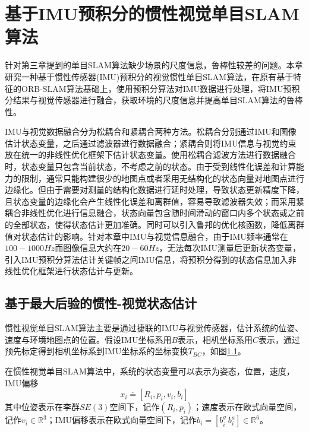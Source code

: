 
\chapter{基于IMU预积分的惯性视觉单目SLAM算法}
\label{chap:VISLAM}
针对第三章提到的单目SLAM算法缺少场景的尺度信息，鲁棒性较差的问题。本章研究一种基于惯性传感器(IMU)预积分的视觉惯性单目SLAM算法，在原有基于特征的ORB-SLAM算法基础上，使用预积分算法对IMU数据进行处理，将IMU预积分结果与视觉传感器进行融合，获取环境的尺度信息并提高单目SLAM算法的鲁棒性。

IMU与视觉数据融合分为松耦合和紧耦合两种方法。松耦合分别通过IMU和图像估计状态变量，之后通过滤波器进行数据融合；紧耦合则将IMU信息与视觉约束放在统一的非线性优化框架下估计状态变量。使用松耦合滤波方法进行数据融合时，状态变量只包含当前状态，不考虑之前的状态。由于受到线性化误差和计算能力的限制，通常只能构建很少的地图点或者采用无结构化的状态向量对地图点进行边缘化。但由于需要对测量的结构化数据进行延时处理，导致状态更新精度下降，且状态变量的边缘化会产生线性化误差和离群值，容易导致滤波器失效；而采用紧耦合非线性优化进行信息融合，状态向量包含随时间滑动的窗口内多个状态或之前的全部状态，使得状态估计更加准确。同时可以引入鲁邦的优化核函数，降低离群值对状态估计的影响。针对本章中IMU与视觉信息融合，由于IMU频率通常在$100-1000Hz$而图像信息大约在$20-60Hz$，无法每次IMU测量后更新状态变量，引入IMU预积分算法估计关键帧之间IMU信息，将预积分得到的状态信息加入非线性优化框架进行状态估计与更新。


\section{基于最大后验的惯性-视觉状态估计}
惯性视觉单目SLAM算法主要是通过捷联的IMU与视觉传感器，估计系统的位姿、速度与环境地图点的位置。假设IMU坐标系用$B$表示，相机坐标系用$C$表示，通过预先标定得到相机坐标系到IMU坐标系的坐标变换$T_{BC}$，如图\ref{fig5.1}。
\begin{figure}
\label{fig5.1}

\end{figure}

在惯性视觉单目SLAM算法中，系统的状态变量可以表示为姿态，位置，速度，IMU偏移
\begin{equation}
\label{equ5.1}
x_i \doteq \left[ R_i,p_i,v_i,b_i \right]
\end{equation}
其中位姿表示在李群$SE(3)$空间下，记作$\left( R_i, p_i \right)$；速度表示在欧式向量空间，记作$v_i \in \mathds{R}^3 $；IMU偏移表示在欧式向量空间下，记作$b_i=[b_i^g \ b_i^a] \in \mathds{R}^6$。

